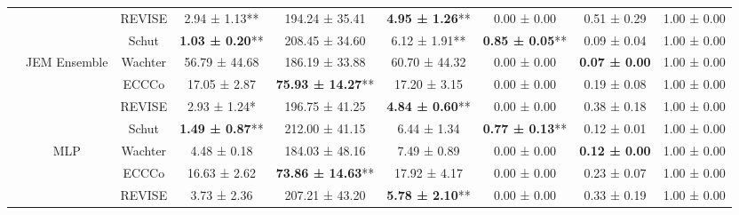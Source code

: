 \begin{table}
{\begin{tabular}[t]{ccccccccc}
 &  & REVISE & 2.94 ± 1.13** & 194.24 ± 35.41\hphantom{*}\hphantom{*} & \textbf{4.95 ± 1.26}** & 0.00 ± 0.00\hphantom{*}\hphantom{*} & 0.51 ± 0.29\hphantom{*}\hphantom{*} & 1.00 ± 0.00\hphantom{*}\hphantom{*}\\

 &  & Schut & \textbf{1.03 ± 0.20}** & 208.45 ± 34.60\hphantom{*}\hphantom{*} & 6.12 ± 1.91** & \textbf{0.85 ± 0.05}** & 0.09 ± 0.04\hphantom{*}\hphantom{*} & 1.00 ± 0.00\hphantom{*}\hphantom{*}\\

 & \multirow[t]{-4}{*}{\centering\arraybackslash JEM Ensemble} & Wachter & 56.79 ± 44.68\hphantom{*}\hphantom{*} & 186.19 ± 33.88\hphantom{*}\hphantom{*} & 60.70 ± 44.32\hphantom{*}\hphantom{*} & 0.00 ± 0.00\hphantom{*}\hphantom{*} & \textbf{0.07 ± 0.00}\hphantom{*}\hphantom{*} & 1.00 ± 0.00\hphantom{*}\hphantom{*}\\
\cmidrule{2-9}
 &  & ECCCo & 17.05 ± 2.87\hphantom{*}\hphantom{*} & \textbf{75.93 ± 14.27}** & 17.20 ± 3.15\hphantom{*}\hphantom{*} & 0.00 ± 0.00\hphantom{*}\hphantom{*} & 0.19 ± 0.08\hphantom{*}\hphantom{*} & 1.00 ± 0.00\hphantom{*}\hphantom{*}\\

 &  & REVISE & 2.93 ± 1.24*\hphantom{*} & 196.75 ± 41.25\hphantom{*}\hphantom{*} & \textbf{4.84 ± 0.60}** & 0.00 ± 0.00\hphantom{*}\hphantom{*} & 0.38 ± 0.18\hphantom{*}\hphantom{*} & 1.00 ± 0.00\hphantom{*}\hphantom{*}\\

 &  & Schut & \textbf{1.49 ± 0.87}** & 212.00 ± 41.15\hphantom{*}\hphantom{*} & 6.44 ± 1.34\hphantom{*}\hphantom{*} & \textbf{0.77 ± 0.13}** & 0.12 ± 0.01\hphantom{*}\hphantom{*} & 1.00 ± 0.00\hphantom{*}\hphantom{*}\\

 & \multirow[t]{-4}{*}{\centering\arraybackslash MLP} & Wachter & 4.48 ± 0.18\hphantom{*}\hphantom{*} & 184.03 ± 48.16\hphantom{*}\hphantom{*} & 7.49 ± 0.89\hphantom{*}\hphantom{*} & 0.00 ± 0.00\hphantom{*}\hphantom{*} & \textbf{0.12 ± 0.00}\hphantom{*}\hphantom{*} & 1.00 ± 0.00\hphantom{*}\hphantom{*}\\
\cmidrule{2-9}
 &  & ECCCo & 16.63 ± 2.62\hphantom{*}\hphantom{*} & \textbf{73.86 ± 14.63}** & 17.92 ± 4.17\hphantom{*}\hphantom{*} & 0.00 ± 0.00\hphantom{*}\hphantom{*} & 0.23 ± 0.07\hphantom{*}\hphantom{*} & 1.00 ± 0.00\hphantom{*}\hphantom{*}\\

 &  & REVISE & 3.73 ± 2.36\hphantom{*}\hphantom{*} & 207.21 ± 43.20\hphantom{*}\hphantom{*} & \textbf{5.78 ± 2.10}** & 0.00 ± 0.00\hphantom{*}\hphantom{*} & 0.33 ± 0.19\hphantom{*}\hphantom{*} & 1.00 ± 0.00\hphantom{*}\hphantom{*}\\


\end{tabular}}
\end{table}
